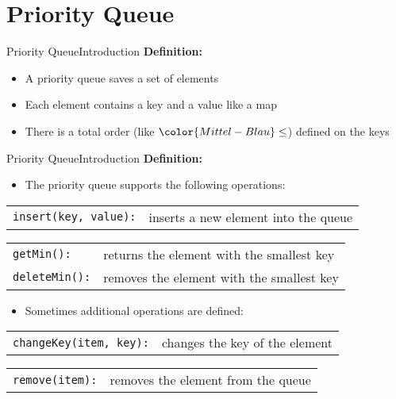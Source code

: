 \section{Priority Queue}


\begin{frame}{Priority Queue}{Introduction}
  \textbf{Definition:}
  \begin{itemize}
    \item<2->
      A priority queue saves a set of elements
    \item<3->
      Each element contains a key and a value like a map
    \item<4->
      There is a total order (like ${\color{Mittel-Blau}\leq}$) defined on the
      keys
  \end{itemize}
\end{frame}


\begin{frame}{Priority Queue}{Introduction}
  \textbf{Definition:}
  \begin{itemize}
    \item<2->
      The priority queue supports the following operations:
  \end{itemize}
  \begin{tabular}{ll}
    {\color{Mittel-Blau}\texttt{insert(key, value):}} &
    inserts a new element into the queue
  \end{tabular}
  \begin{tabular}{ll}
    {\color{Mittel-Blau}\texttt{getMin():}} &
    returns the element with the smallest key\\
    {\color{Mittel-Blau}\texttt{deleteMin():}} &
    removes the element with the smallest key
  \end{tabular}
  \vspace{1.0em}
  \begin{itemize}
    \item<5->
      Sometimes additional operations are defined:
  \end{itemize}
  \begin{tabular}{ll}
    {\color{Mittel-Blau}\texttt{changeKey(item, key):}} &
    changes the key of the element
  \end{tabular}
  \begin{tabular}{ll}
    {\color{Mittel-Blau}\texttt{remove(item):}} &
    removes the element from the queue
  \end{tabular}
\end{frame}

